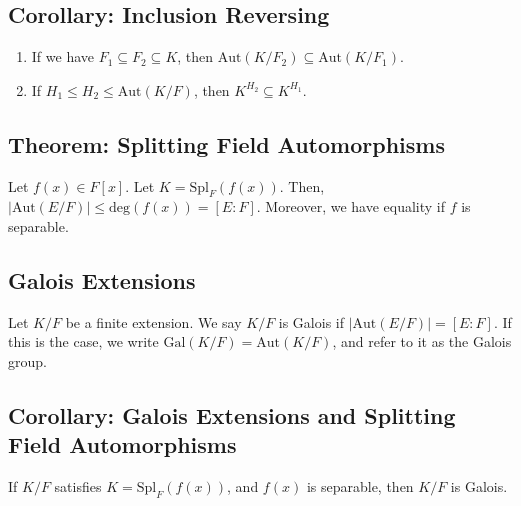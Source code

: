 \documentclass[10pt]{extarticle}
\begin{document}
  \subsection{Corollary: Inclusion Reversing}%
  \begin{enumerate}[(1)]
    \item If we have $F_1 \subseteq F_2 \subseteq K$, then $\text{Aut}(K/F_2) \subseteq \text{Aut}(K/F_1)$.
    \item If $H_1 \leq H_2 \leq \text{Aut}(K/F)$, then $K^{H_2}\subseteq K^{H_1}$.
  \end{enumerate}
  \subsection{Theorem: Splitting Field Automorphisms}%
  Let $f(x) \in F[x]$. Let $K = \text{Spl}_{F}(f(x))$. Then, $|\text{Aut}(E/F)| \leq \text{deg}(f(x)) = [E:F]$. Moreover, we have equality if $f$ is separable.
  \subsection{Galois Extensions}%
  Let $K/F$ be a finite extension. We say $K/F$ is Galois if $|\text{Aut}(E/F)| = [E:F]$. If this is the case, we write $\text{Gal}(K/F) = \text{Aut}(K/F)$, and refer to it as the Galois group.
  \subsection{Corollary: Galois Extensions and Splitting Field Automorphisms}%
  If $K/F$ satisfies $K = \text{Spl}_{F}(f(x))$, and $f(x)$ is separable, then $K/F$ is Galois.
\end{document}
